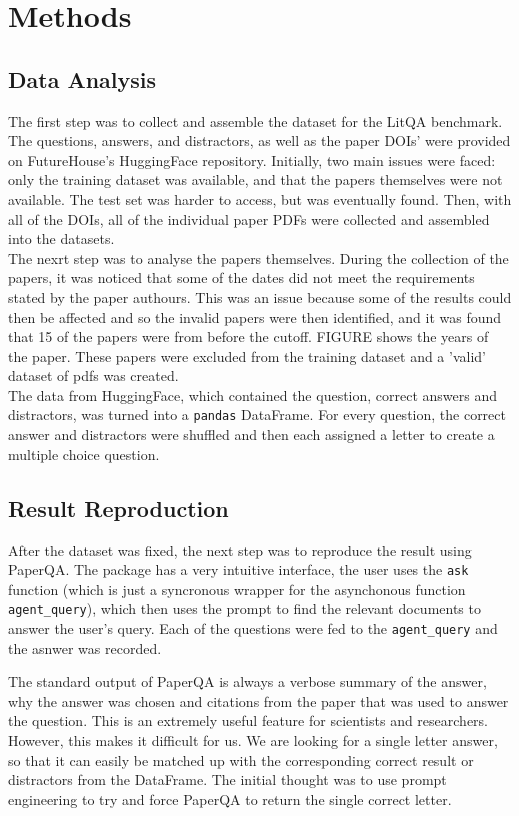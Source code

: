 \section{Methods}
\label{sec:methods}

\subsection{Data Analysis}
The first step was to collect and assemble the dataset for the LitQA benchmark. 
The questions, answers, and distractors, as well as the paper DOIs' were provided on FutureHouse's HuggingFace repository. 
Initially, two main issues were faced: only the training dataset was available, and that the papers themselves were not available. The test set was harder to access, but was eventually found. Then, with all of the DOIs, all of the individual paper PDFs were collected and assembled into the datasets. \\

The nexrt step was to analyse the papers themselves. During the collection of the papers, it was noticed that some of the dates did not meet the requirements stated by the paper authours. This was an issue because some of the results could then be affected and so the invalid papers were then identified, and it was found that 15 of the papers were from before the cutoff. FIGURE shows the years of the paper. These papers were excluded from the training dataset and a 'valid' dataset of pdfs was created. \\

The data from HuggingFace, which contained the question, correct answers and distractors, was turned into a \texttt{pandas} DataFrame. For every question, the correct answer and distractors were shuffled and then each assigned a letter to create a multiple choice question.

\subsection{Result Reproduction}
After the dataset was fixed, the next step was to reproduce the result using PaperQA.
The package has a very intuitive interface, the user uses the \texttt{ask} function (which is just a syncronous wrapper for the asynchonous function \texttt{agent\_query}), which then uses the prompt to find the relevant documents to answer the user's query. Each of the questions were fed to the \texttt{agent\_query} and the asnwer was recorded.

The standard output of PaperQA is always a verbose summary of the answer, why the answer was chosen and citations from the paper that was used to answer the question. This is an extremely useful feature for scientists and researchers. 
However, this makes it difficult for us. We are looking for a single letter answer, so that it can easily be matched up with the corresponding correct result or distractors from the DataFrame. The initial thought was to use prompt engineering to try and force PaperQA to return the single correct letter. 

